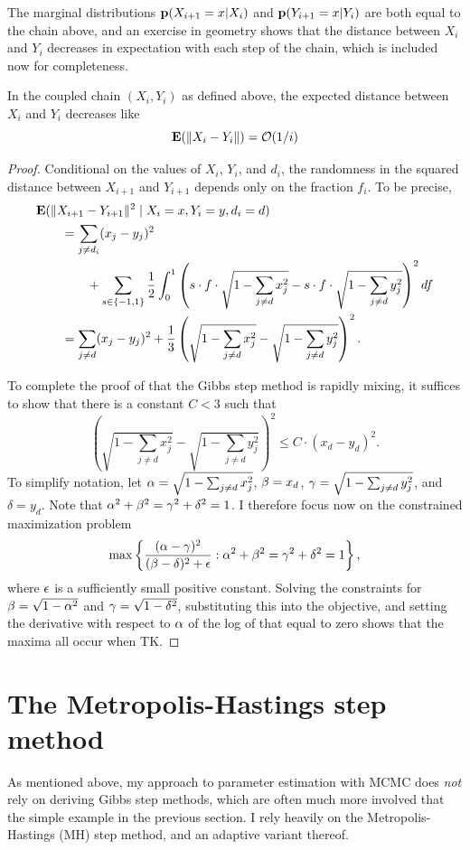 The marginal distributions $\mathbf{p}(X_{i+1}=x|X_i)$ and
$\mathbf{p}(Y_{i+1}=x|Y_i)$ are both equal to the chain above, and an
exercise in geometry shows that the distance between $X_i$ and $Y_i$
decreases in expectation with each step of the chain, which is
included now for completeness.

\begin{thm} In the coupled chain $(X_i, Y_i)$ as defined above, the expected distance between $X_i$ and $Y_i$ decreases like
\[
\mathbf{E}(\|X_i - Y_i\|) = \mathcal{O}(1/i)
\]
\end{thm}

\begin{proof} Conditional on the values of $X_{i}$, $Y_{i}$, and
$d_i$, the randomness in the squared distance between $X_{i+1}$ and $Y_{i+1}$ depends only
on the fraction $f_i$.  To be precise,
\begin{align*}
&\mathbf{E}(\|X_{i+1} - Y_{i+1}\|^2 \;|\; X_{i}=x, Y_{i}=y, d_i=d)
\\
&\qquad= \sum_{j \neq d_i} (x_j - y_j)^2
\\
&\qquad\qquad+ \sum_{s\in \{-1,1\}} \frac{1}{2} \int_0^1 
\left(s\cdot f\cdot\sqrt{1 - \sum_{j\neq d} x_j^2} 
- s\cdot f\cdot\sqrt{1 - \sum_{j\neq d} y_j^2}\right)^2 df
\\
&\qquad= \sum_{j \neq d} (x_j - y_j)^2
+ \frac{1}{3}\left(\sqrt{1 - \sum_{j\neq d} x_j^2} 
- \sqrt{1 - \sum_{j\neq d} y_j^2}\right)^2.
\end{align*}

To complete the proof of that the Gibbs step method is rapidly mixing, it suffices to show that there is a constant $C < 3$ such that
\[
\left(\sqrt{1 - \sum_{j\neq d} x_j^2} 
- \sqrt{1 - \sum_{j\neq d} y_j^2}\right)^2
\leq C\cdot(x_d - y_d)^2.
\]
To simplify notation, let
$\alpha = \sqrt{1 - \sum_{j\neq d} x_j^2}$, $\beta=x_d$, $\gamma = \sqrt{1
  - \sum_{j\neq d} y_j^2}$, and $\delta = y_d$.  Note that $\alpha^2 + \beta^2 = \gamma^2 + \delta^2 = 1$.
I therefore focus now on the constrained maximization problem 
\[
\max
\left\{\frac{(\alpha-\gamma)^2}{(\beta-\delta)^2+\epsilon} : \alpha^2+\beta^2 = \gamma^2+\delta^2 = 1\right\},
\]
where $\epsilon$ is a sufficiently small positive constant.  Solving the constraints
for $\beta = \sqrt{1-\alpha^2}$ and $\gamma = \sqrt{1-\delta^2}$, substituting
this into the objective, and setting the derivative with respect to $\alpha$ of the log of that
equal to zero shows that the maxima all occur when TK.

\end{proof}

\section{The Metropolis-Hastings step method}
As mentioned above, my approach to parameter estimation with MCMC does
\emph{not} rely on deriving Gibbs step methods, which are often much
more involved that the simple example in the previous section.  I rely
heavily on the Metropolis-Hastings (MH) step method, and an adaptive
variant thereof.

